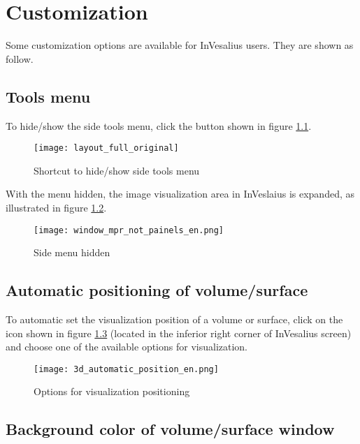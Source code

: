 \chapter{Customization}

Some customization options are available for InVesalius users. They are shown as follow.

\section{Tools menu}

To hide/show the side tools menu, click the button shown in figure
\ref{fig:layout_full_original}.

\begin{figure}[!htb]
\centering
\texttt{[image: layout\_full\_original]}
\caption{Shortcut to hide/show side tools menu}
\label{fig:layout_full_original}
\end{figure}

With the menu hidden, the image visualization area in InVeslaius is expanded, as illustrated in figure \ref{fig:closed_tool_menu}.

\begin{figure}[!htb]
\centering
\texttt{[image: window\_mpr\_not\_painels\_en.png]}
\caption{Side menu hidden}
\label{fig:closed_tool_menu}
\end{figure}

\newpage

\section{Automatic positioning of volume/surface}

To automatic set the visualization position of a volume or surface,
click on the icon shown in figure \ref{fig:3d_automatic_position}
(located in the inferior right corner of InVesalius screen) and choose one of the available options for visualization.

\begin{figure}[!htb]
\centering
\texttt{[image: 3d\_automatic\_position\_en.png]}
\caption{Options for visualization positioning}
\label{fig:3d_automatic_position}
\end{figure}

\section{Background color of volume/surface window}

